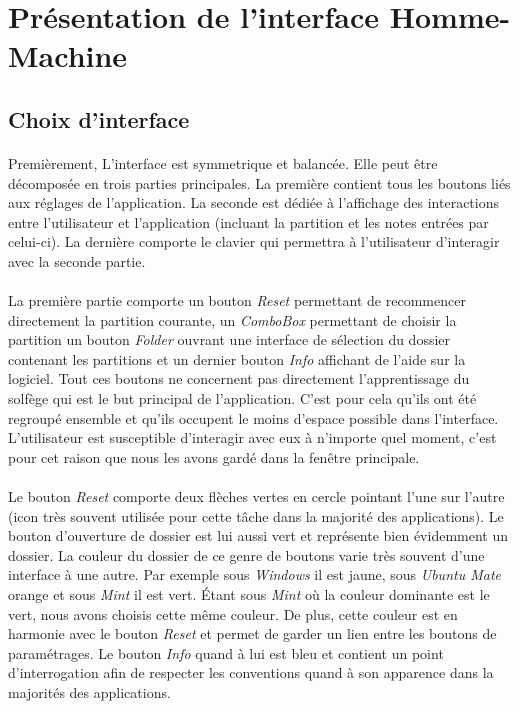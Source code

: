 \documentclass[a4paper, 12pt]{article}
\begin{document}
\section{Présentation de l'interface Homme-Machine}
    \subsection{Choix d'interface}
    \paragraph{}
    Premièrement, L'interface est symmetrique et balancée. Elle peut être décomposée en trois parties principales. La première contient tous les boutons liés aux réglages de l'application. La seconde est dédiée à l'affichage des interactions entre l'utilisateur et l'application (incluant la partition et les notes entrées par celui-ci). La dernière comporte le clavier qui permettra à l'utilisateur d'interagir avec la seconde partie.
    
    \paragraph{}
    La première partie comporte un bouton \emph{Reset} permettant de recommencer directement la partition courante, un \emph{ComboBox} permettant de choisir la partition un bouton \emph{Folder} ouvrant une interface de sélection du dossier contenant les partitions et un dernier bouton \emph{Info} affichant de l'aide sur la logiciel. Tout ces boutons ne concernent pas directement l'apprentissage du solfège qui est le but principal de l'application. C'est pour cela qu'ils ont été regroupé ensemble et qu'ils occupent le moins d'espace possible dans l'interface. L'utilisateur est susceptible d'interagir avec eux à n'importe quel moment, c'est pour cet raison que nous les avons gardé dans la fenêtre principale.
    
    \paragraph{}
    Le bouton \emph{Reset} comporte deux flèches vertes en cercle pointant l'une sur l'autre (icon très souvent utilisée pour cette tâche dans la majorité des applications). Le bouton d'ouverture de dossier est lui aussi vert et représente bien évidemment un dossier. La couleur du dossier de ce genre de boutons varie très souvent d'une interface à une autre. Par exemple sous \emph{Windows} il est jaune, sous \emph{Ubuntu Mate} orange et sous \emph{Mint} il est vert. Étant sous \emph{Mint} où la couleur dominante est le vert, nous avons choisis cette même couleur. De plus, cette couleur est en harmonie avec le bouton \emph{Reset} et permet de garder un lien entre les boutons de paramétrages. Le bouton \emph{Info} quand à lui est bleu et contient un point d'interrogation afin de respecter les conventions quand à son apparence dans la majorités des applications.
    
\end{document}
